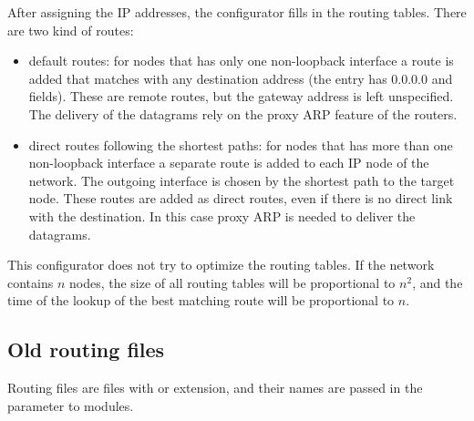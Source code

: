 After assigning the IP addresses, the configurator fills in the routing tables.
There are two kind of routes:
\begin{itemize}
  \item default routes: for nodes that has only one non-loopback interface
        a route is added that matches with any destination address
        (the entry has 0.0.0.0  and  fields).
        These are remote routes, but the gateway address is left unspecified.
        The delivery of the datagrams rely on the proxy ARP feature of the
        routers.
  \item direct routes following the shortest paths: for nodes that has more
        than one non-loopback interface a separate route is added to each
        IP node of the network. The outgoing interface is chosen by the
        shortest path to the target node. These routes are
        added as direct routes, even if there is no direct link with the
        destination. In this case proxy ARP is needed to deliver the datagrams.
\end{itemize}

\begin{note}
This configurator does not try to optimize the routing tables.
If the network contains $n$ nodes, the size of all routing tables
will be proportional to $n^2$, and the time of the lookup of the
best matching route will be proportional to $n$.
\end{note}


\subsection{Old routing files}
\label{subsec:routing_files}

Routing files are files with  or  extension,
and their names are passed in the  parameter
to  modules.

